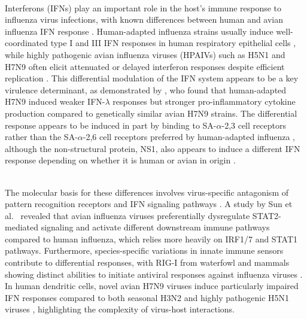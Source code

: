 \documentclass[12pt]{article}
\begin{document}
\noindent \\ Interferons (IFNs) play an important role in the host's immune response to influenza virus infections, with known differences between human and avian influenza IFN response \cite{arilahti14,ramos11,monteagudo20,lee09h5n1,matthaei13,zeng07}. Human-adapted influenza strains usually induce well-coordinated type I and III IFN responses in human respiratory epithelial cells \cite{wenxin20}, while highly pathogenic avian influenza viruses (HPAIVs) such as H5N1 and H7N9 often elicit attenuated or delayed interferon responses despite efficient replication \cite{cao17imm, zeng07}. This differential modulation of the IFN system appears to be a key virulence determinant, as demonstrated by \cite{to16}, who found that human-adapted H7N9 induced weaker IFN-$\lambda$ responses but stronger pro-inflammatory cytokine production compared to genetically similar avian H7N9 strains. The differential response appears to be induced in part by binding to SA-$\alpha$-2,3 cell receptors rather than the SA-$\alpha$-2,6 cell receptors preferred by human-adapted influenza \cite{ramos11}, although the non-structural protein, NS1, also appears to induce a different IFN response depending on whether it is human or avian in origin \cite{monteagudo20}. 

\noindent \\ The molecular basis for these differences involves virus-specific antagonism of pattern recognition receptors and IFN signaling pathways \cite{lee09h5n1}. A study by Sun et al.\ \cite{sun19} revealed that avian influenza viruses preferentially dysregulate STAT2-mediated signaling and activate different downstream immune pathways compared to human influenza, which relies more heavily on IRF1/7 and STAT1 pathways. Furthermore, species-specific variations in innate immune sensors contribute to differential responses, with RIG-I from waterfowl and mammals showing distinct abilities to initiate antiviral responses against influenza viruses \cite{shao15}. In human dendritic cells, novel avian H7N9 viruses induce particularly impaired IFN responses compared to both seasonal H3N2 and highly pathogenic H5N1 viruses \cite{arilahti14}, highlighting the complexity of virus-host interactions. 
\end{document}
